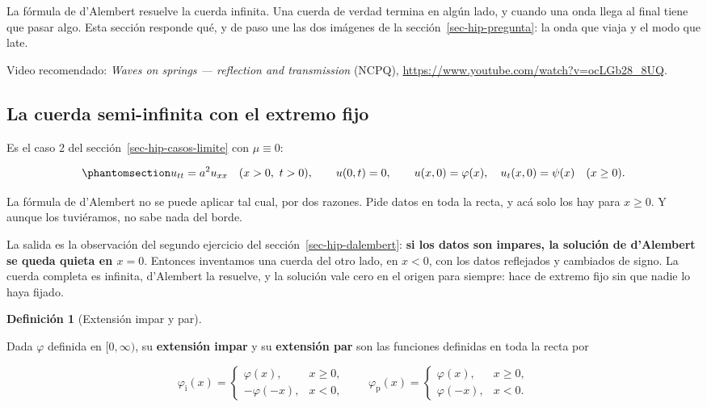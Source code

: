 \documentclass[
  spanish,
  a4paper,
]{scrbook}
\theoremstyle{definition}
\newtheorem{definition}{Definición}[chapter]
\theoremstyle{plain}
\theoremstyle{definition}
\theoremstyle{plain}
\theoremstyle{definition}
\theoremstyle{remark}
\begin{document}
La fórmula de d'Alembert resuelve la cuerda infinita. Una cuerda de
verdad termina en algún lado, y cuando una onda llega al final tiene que
pasar algo. Esta sección responde qué, y de paso une las dos imágenes de
la sección~\ref{sec-hip-pregunta}: la onda que viaja y el modo que late.

Video recomendado: \emph{Waves on springs --- reflection and
transmission} (NCPQ), \url{https://www.youtube.com/watch?v=ocLGb28_8UQ}.

\subsection{La cuerda semi-infinita con el extremo
fijo}\label{sec-hip-semi-fijo}

Es el caso 2 del sección~\ref{sec-hip-casos-limite} con \(\mu\equiv0\):

\begin{equation}\protect\phantomsection\label{eq-hip-semi}{
u_{tt} = a^2u_{xx}\quad (x>0,\ t>0), \qquad u(0,t) = 0, \qquad u(x,0) = \varphi(x),\quad u_t(x,0) = \psi(x)\quad (x\ge 0).
}\end{equation}

La fórmula de d'Alembert no se puede aplicar tal cual, por dos razones.
Pide datos en toda la recta, y acá solo los hay para \(x\ge0\). Y aunque
los tuviéramos, no sabe nada del borde.

La salida es la observación del segundo ejercicio del
sección~\ref{sec-hip-dalembert}: \textbf{si los datos son impares, la
solución de d'Alembert se queda quieta en \(x=0\)}. Entonces inventamos
una cuerda del otro lado, en \(x<0\), con los datos reflejados y
cambiados de signo. La cuerda completa es infinita, d'Alembert la
resuelve, y la solución vale cero en el origen para siempre: hace de
extremo fijo sin que nadie lo haya fijado.

\begin{definition}[Extensión impar y
par]\protect\hypertarget{def-hip-extension}{}\label{def-hip-extension}

Dada \(\varphi\) definida en \([0,\infty)\), su \textbf{extensión impar}
y su \textbf{extensión par} son las funciones definidas en toda la recta
por

\[
\varphi_{\text{i}}(x) = \begin{cases}\varphi(x), & x\ge0,\\ -\varphi(-x), & x<0,\end{cases}
\qquad
\varphi_{\text{p}}(x) = \begin{cases}\varphi(x), & x\ge0,\\ \varphi(-x), & x<0.\end{cases}
\]

\end{definition}
\end{document}
